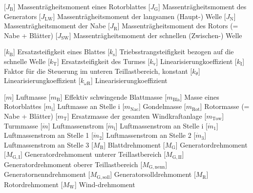 \documentclass[
	pagesize,
	fontsize=12pt,
	paper=a4,
	oneside,
    reqno
]{scrartcl}
\numberwithin{equation}{section} %
\numberwithin{table}{section} %
\numberwithin{figure}{section} %
\begin{document}
\begin{acronym}[Symbols]
           [$J_{\mathrm{B}}$]          {Massenträgheitsmoment eines Rotorblattes}
           [$J_{\mathrm{G}}$]          {Massenträgheitsmoment des Generators}
          [$J_{\mathrm{LW}}$]         {Massenträgheitsmoment der langsamen (Haupt-) Welle}
           [$J_{\mathrm{N}}$]          {Massenträgheitsmoment der Nabe}
           [$J_{\mathrm{R}}$]          {Massenträgheitsmoment des Rotors (= Nabe + Blätter)}
          [$J_{\mathrm{SW}}$]         {Massenträgheitsmoment der schnellen (Zwischen-) Welle}
    
           [$k_{\mathrm{B}}$]          {Ersatzsteifigkeit eines Blattes}    
           [$k_{\mathrm{s}}$]          {Triebsstrangsteifigkeit bezogen auf die schnelle Welle}
           [$k_{\mathrm{T}}$]          {Ersatzsteifigkeit des Turmes}
           [$k_{\mathrm{v}}$]          {Linearisierungkoeffizient} 
           [$k_{\mathrm{I}}$]          {Faktor für die Steuerung im unteren Teillastbereich, konstant}
       [$k_{\theta}$]              {Linearisierungkoeffizient}
      [$k_{\omega\mathrm{R}}$]    {Linearisierungkoeffizient}
    
            [$m$]                       {Luftmasse}
           [$m_{\mathrm{B}}$]          {Effektiv schwingende Blattmasse}     
         [$m_{\mathrm{Bla}}$]        {Masse eines Rotorblattes}
           [$m_{\mathrm{i}}$]          {Luftmasse an Stelle i}
         [$m_{\mathrm{Nac}}$]        {Gondelmasse}    
         [$m_{\mathrm{Rot}}$]        {Rotormasse (= Nabe + Blätter)}
           [$m_{\mathrm{T}}$]          {Ersatzmasse der gesamten Windkraftanlage}
         [$m_{\mathrm{Tow}}$]        {Turmmasse}
         [$\dot m$]                  {Luftmassenstrom}
        [$\dot{m}_{\mathrm{i}}$]    {Luftmassenstrom an Stelle i}
        [$\dot{m}_{\mathrm{1}}$]    {Luftmassenstrom an Stelle 1}
        [$\dot{m}_{\mathrm{2}}$]    {Luftmassenstrom an Stelle 2}
        [$\dot{m}_{\mathrm{3}}$]    {Luftmassenstrom an Stelle 3}        [$M_{\mathrm{B}}$]          {Blattdrehmoment}   
           [$M_{\mathrm{G}}$]          {Generatordrehmoment}
          [$M_{\mathrm{G,I}}$]        {Generatordrehmoment unterer Teillastbereich}
          [$M_{\mathrm{G,II}}$]       {Generatordrehmoment oberer Teillastbereich}
       [$M_{\mathrm{G,nenn}}$]     {Generatornenndrehmoment}
       [$M_{\mathrm{G,soll}}$]     {Generatorsolldrehmoment}
           [$M_{\mathrm{R}}$]          {Rotordrehmoment}
           [$M_{\mathrm{W}}$]          {\glqq Wind\grqq{}-drehmoment}
    

\end{acronym}
\end{document}
